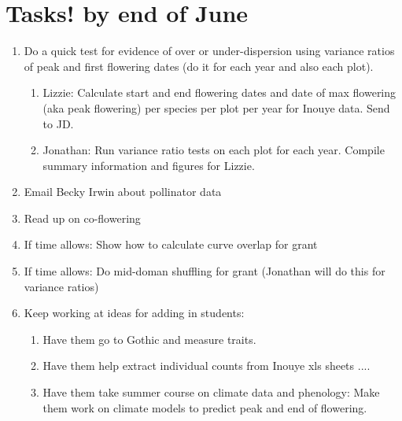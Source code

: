 \documentclass[11pt,a4paper]{article}
\begin{document}
\section{Tasks! by end of June}
\begin{enumerate}
\item Do a quick test for evidence of over or under-dispersion using variance ratios of peak and first flowering dates (do it for each year and also each plot).
\begin{enumerate}
\item Lizzie: Calculate start and end flowering dates and date of max flowering (aka peak flowering) per species per plot per year for Inouye data. Send to JD.
\item Jonathan: Run variance ratio tests on each plot for each year. Compile summary information and figures for Lizzie.
\end{enumerate}
\item Email Becky Irwin about pollinator data
\item Read up on co-flowering
\item If time allows: Show how to calculate curve overlap for grant
\item If time allows: Do mid-doman shuffling for grant (Jonathan will do this for variance ratios)
\item Keep working at ideas for adding in students:
\begin{enumerate}
\item Have them go to Gothic and measure traits.
\item Have them help extract individual counts from Inouye xls sheets ....
\item Have them take summer course on climate data and phenology: Make them work on climate models to predict peak and end of flowering. 
\end{enumerate}
\end{enumerate}
\end{document}
